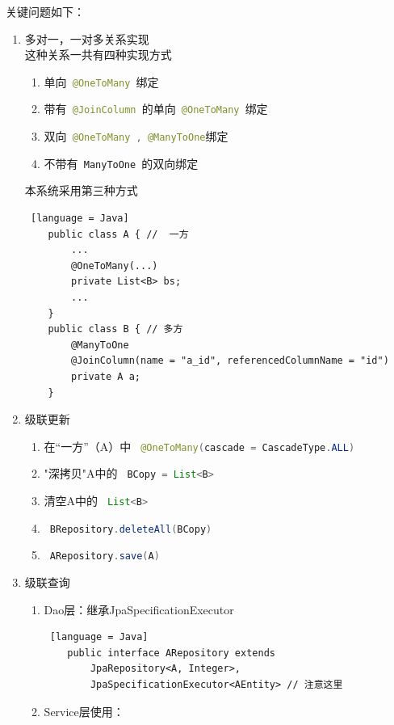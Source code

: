 关键问题如下：

\begin{enumerate}
  \item 多对一，一对多关系实现\\
        这种关系一共有四种实现方式
        \begin{enumerate}
          \item 单向\lstinline[language = Java]| @OneToMany |绑定
          \item 带有\lstinline[language = Java]| @JoinColumn |的单向\lstinline[language = Java]| @OneToMany |绑定
          \item 双向\lstinline[language = Java]| @OneToMany , @ManyToOne|绑定
          \item 不带有\lstinline[language = Java]| ManyToOne |的双向绑定
        \end{enumerate}
        本系统采用第三种方式
        \begin{lstlisting} [language = Java]
    public class A { //  一方
        ...
        @OneToMany(...)
        private List<B> bs;
        ...
    }
    public class B { // 多方
        @ManyToOne
        @JoinColumn(name = "a_id", referencedColumnName = "id")
        private A a;
    }
\end{lstlisting}
  \item 级联更新
        \begin{enumerate}
          \item 在“一方”（A）中 \lstinline[language = Java]| @OneToMany(cascade = CascadeType.ALL) |
          \item "深拷贝"A中的 \lstinline[language = Java]| BCopy = List<B> |
          \item 清空A中的 \lstinline[language = Java]| List<B> |
          \item \lstinline[language = Java]| BRepository.deleteAll(BCopy) |
          \item \lstinline[language = Java]| ARepository.save(A) |
        \end{enumerate}
  \item 级联查询
        \begin{enumerate}
          \item Dao层：继承JpaSpecificationExecutor
                \begin{lstlisting} [language = Java]
    public interface ARepository extends 
        JpaRepository<A, Integer>, 
        JpaSpecificationExecutor<AEntity> // 注意这里
\end{lstlisting}
          \item Service层使用：

\end{enumerate}
\end{enumerate}

